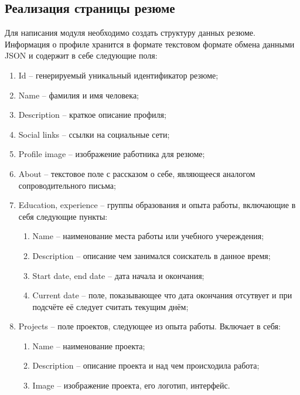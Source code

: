 \documentclass[master, och, diploma]{SCWorks}
\begin{document}
\subsection{Реализация страницы резюме}
Для написания модуля необходимо создать структуру данных резюме. Информация о профиле хранится в формате текстовом формате обмена данными JSON и содержит в себе следующие поля:
\begin{enumerate}
    \item Id -- генерируемый уникальный идентификатор резюме;
    \item Name -- фамилия и имя человека;
    \item Description -- краткое описание профиля;
    \item Social links -- ссылки на социальные сети;
    \item Profile image -- изображение работника для резюме;
    \item About -- текстовое поле с рассказом о себе, являющееся аналогом сопроводительного письма;
    \item Education, experience -- группы образования и опыта работы, включающие в себя следующие пункты:
    \begin{enumerate}
        \item Name -- наименование места работы или учебного учереждения;
        \item Description -- описание чем занимался соискатель в данное время;
        \item Start date, end date -- дата начала и окончания; 
        \item Current date -- поле, показывающее что дата окончания отсутвует и при подсчёте её следует считать текущим днём;
    \end{enumerate}
    \item Projects -- поле проектов, следующее из опыта работы. Включает в себя:
    \begin{enumerate}
        \item Name -- наименование проекта;
        \item Description -- описание проекта и над чем происходила работа;
        \item Image -- изображение проекта, его логотип, интерфейс.
    \end{enumerate}
\end{enumerate}
\end{document}
